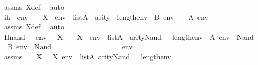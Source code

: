 \begin{isabellebody}
\ assms{}\ X{\isacharunderscore}{\kern0pt}def\ \isamarkupfalse%
\ auto\isanewline
\ \ \ \ \isamarkupfalse%
\ ih{}\ {\isacharcolon}{\kern0pt}\ {\isachardoublequoteopen}{\isasymAnd}env\ {\isasymphi}{\isachardot}{\kern0pt}\ {\isasymphi}\ {\isasymin}\ X\ {\isasymLongrightarrow}\ env\ {\isasymin}\ list{\isacharparenleft}{\kern0pt}A{\isacharparenright}{\kern0pt}\ {\isasymLongrightarrow}\ arity{\isacharparenleft}{\kern0pt}{\isasymphi}{\isacharparenright}{\kern0pt}\ {\isasymle}\ length{\isacharparenleft}{\kern0pt}env{\isacharparenright}{\kern0pt}\ {\isasymLongrightarrow}\ B{\isacharcomma}{\kern0pt}\ env\ {\isasymTurnstile}\ {\isasymphi}\ {\isasymLongrightarrow}\ A{\isacharcomma}{\kern0pt}\ env\ {\isasymTurnstile}\ {\isasymphi}{\isachardoublequoteclose}\ \isamarkupfalse%
\ assms{}\ X{\isacharunderscore}{\kern0pt}def\ \isamarkupfalse%
\ auto\isanewline
\isanewline
\ \ \ \ \isamarkupfalse%
\ Hnand{\isacharcolon}{\kern0pt}\ {\isachardoublequoteopen}{\isasymAnd}{\isasymphi}\ {\isasympsi}\ env{\isachardot}{\kern0pt}\ {\isasymphi}\ {\isasymin}\ X\ {\isasymLongrightarrow}\ {\isasympsi}\ {\isasymin}\ X\ {\isasymLongrightarrow}\ env\ {\isasymin}\ list{\isacharparenleft}{\kern0pt}A{\isacharparenright}{\kern0pt}\ {\isasymLongrightarrow}\ arity{\isacharparenleft}{\kern0pt}Nand{\isacharparenleft}{\kern0pt}{\isasymphi}{\isacharcomma}{\kern0pt}\ {\isasympsi}{\isacharparenright}{\kern0pt}{\isacharparenright}{\kern0pt}\ {\isasymle}\ length{\isacharparenleft}{\kern0pt}env{\isacharparenright}{\kern0pt}\ {\isasymLongrightarrow}\ A{\isacharcomma}{\kern0pt}\ env\ {\isasymTurnstile}\ Nand{\isacharparenleft}{\kern0pt}{\isasymphi}{\isacharcomma}{\kern0pt}\ {\isasympsi}{\isacharparenright}{\kern0pt}\ {\isasymlongleftrightarrow}\ B{\isacharcomma}{\kern0pt}\ env\ {\isasymTurnstile}\ Nand{\isacharparenleft}{\kern0pt}{\isasymphi}{\isacharcomma}{\kern0pt}\ {\isasympsi}{\isacharparenright}{\kern0pt}{\isachardoublequoteclose}\ \isanewline
\ \ \ \ \isamarkupfalse%
\ {\isacharminus}{\kern0pt}\ \isanewline
\ \ \ \ \ \ \isamarkupfalse%
\ {\isasymphi}\ {\isasympsi}\ env\ \isanewline
\ \ \ \ \ \ \isamarkupfalse%
\ assms{}\ {\isacharcolon}{\kern0pt}\ {\isachardoublequoteopen}{\isasymphi}\ {\isasymin}\ X{\isachardoublequoteclose}\ {\isachardoublequoteopen}{\isasympsi}\ {\isasymin}\ X{\isachardoublequoteclose}\ {\isachardoublequoteopen}env\ {\isasymin}\ list{\isacharparenleft}{\kern0pt}A{\isacharparenright}{\kern0pt}{\isachardoublequoteclose}\ {\isachardoublequoteopen}arity{\isacharparenleft}{\kern0pt}Nand{\isacharparenleft}{\kern0pt}{\isasymphi}{\isacharcomma}{\kern0pt}\ {\isasympsi}{\isacharparenright}{\kern0pt}{\isacharparenright}{\kern0pt}\ {\isasymle}\ length{\isacharparenleft}{\kern0pt}env{\isacharparenright}{\kern0pt}{\isachardoublequoteclose}\ \isanewline

\end{isabellebody}
